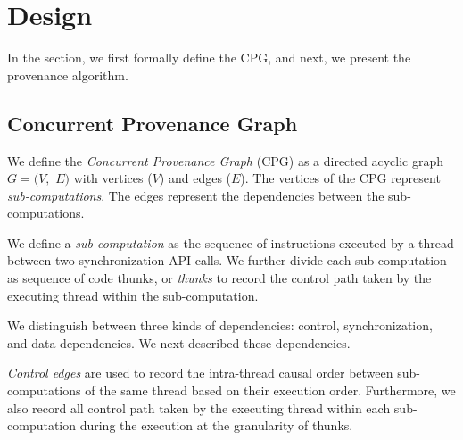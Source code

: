 \section{Design}
\label{sec:algorithms}
In the section, we first formally define the CPG, and next, we present the provenance algorithm.

\subsection{Concurrent Provenance Graph}  We define the {\em
Concurrent Provenance Graph} (CPG)  as a directed acyclic graph $G =
(V,$ $E)$ with vertices ($V$) and edges ($E$). The
vertices of the CPG represent {\em sub-computations}. The edges represent the dependencies between the sub-computations. %

 We define a {\em sub-computation}  as the sequence of instructions
executed by a thread between two \pthreads synchronization API calls. %
We further divide each sub-computation as sequence of code thunks, or {\em thunks} to record the control path taken by the executing thread within the sub-computation.


 We distinguish between three kinds of dependencies: control, synchronization, and data dependencies. We next described these dependencies.



 

 {\em Control edges}  are used to record the intra-thread causal order between sub-computations of the same thread
based on their execution order. Furthermore, we also record all control path taken by the executing thread within each sub-computation during the execution at the granularity of {thunks}.  

